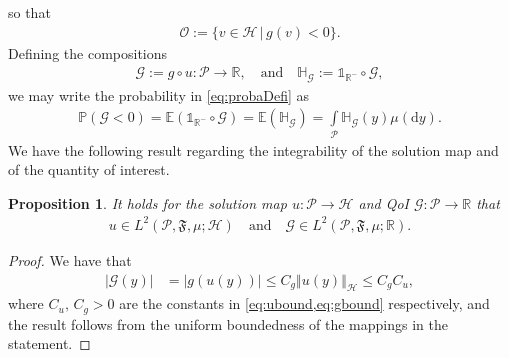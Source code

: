 \documentclass{article}
\newtheorem{proposition}[theorem]{Proposition}
\newcommand{\cG}{\mathcal{G}}
\newcommand{\cH}{\mathcal{H}}
\newcommand{\cO}{\mathcal{O}}
\newcommand{\cP}{\mathcal{P}}
\newcommand{\fF}{\mathfrak{F}}
\newcommand{\IE}{\mathbb{E}}
\newcommand{\IH}{\mathbb{H}}
\newcommand{\IP}{\mathbb{P}}
\newcommand{\IR}{\mathbb{R}}
\newcommand{\bOne}{\mathds{1}}
\renewcommand{\d}{{\text{d}}}
\newcommand{\dy}{{\d y}}
\newcommand{\norm}[2]{{\left\Vert #2 \right\Vert}_{#1}}
\newcommand{\abs}[1]{{\left\vert #1 \right\vert}}
\newcommand{\lp}[2]{{L}^{#1}( #2 )}
\theoremstyle{definition}
\begin{document}
so that
\begin{align}
\cO:=\{v\in\cH\,\vert\, g(v) < 0\}.
\end{align}
Defining the compositions
\begin{align}
  \label{eq:qoi}
  \cG:=g\circ u:\cP\to\IR,\quad\text{and}\quad\IH_\cG:=\bOne_{\IR^-}\circ\cG,
\end{align}
we may write the probability in \cref{eq:probaDefi} as
\begin{align}
  \label{eq:probaDefi2}
  \IP(\cG<0)=\IE\left(\bOne_{\IR^-}\circ\cG\right)=\IE\left(\IH_\cG\right)=\int\limits_{\cP}\IH_\cG(y)\mu(\dy).
\end{align}
We have the following result regarding the integrability of the solution map and of the
quantity of interest.
\begin{proposition} 
  It holds for the solution map $u:\cP\to\cH$ and QoI $\cG:\cP\to\IR$ that
  \begin{align*}
    u\in\lp{2}{\cP, \fF, \mu;\cH}\quad\text{and}\quad \cG\in\lp{2}{\cP, \fF, \mu;\IR}.
  \end{align*}
\end{proposition}
\begin{proof}
  We have that
  \begin{align*}
    \abs{\cG(y)} &= \abs{g(u(y))}\leq C_g\norm{\cH}{u(y)}\leq C_gC_u,
  \end{align*}
  where $C_u,\,C_g>0$ are the constants in \cref{eq:ubound,eq:gbound} respectively,
  and the result follows from the uniform boundedness of the mappings in the statement.
\end{proof}
\end{document}
